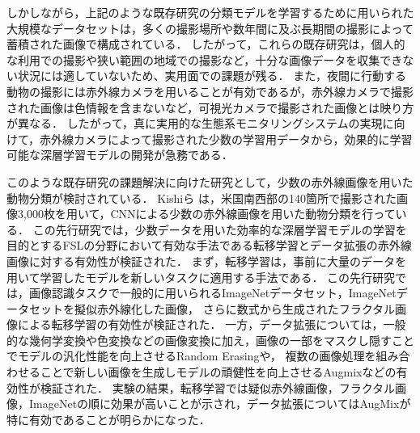 しかしながら，上記のような既存研究の分類モデルを学習するために用いられた大規模なデータセットは，多くの撮影場所や数年間に及ぶ長期間の撮影によって蓄積された画像で構成されている．
したがって，これらの既存研究は，個人的な利用での撮影や狭い範囲の地域での撮影など，十分な画像データを収集できない状況には適していないため、実用面での課題が残る．
また，夜間に行動する動物の撮影には赤外線カメラを用いることが有効であるが，赤外線カメラで撮影された画像は色情報を含まないなど，可視光カメラで撮影された画像とは映り方が異なる．
したがって，真に実用的な生態系モニタリングシステムの実現に向けて，赤外線カメラによって撮影された少数の学習用データから，効果的に学習可能な深層学習モデルの開発が急務である．

このような既存研究の課題解決に向けた研究として，少数の赤外線画像を用いた動物分類が検討されている．
Kishiら \cite{kishimoto2023}は，米国南西部の140箇所で撮影された画像3,000枚を用いて，CNNによる少数の赤外線画像を用いた動物分類を行っている．
この先行研究では，少数データを用いた効率的な深層学習モデルの学習を目的とするFSLの分野において有効な手法である転移学習とデータ拡張の赤外線画像に対する有効性が検証された．
まず，転移学習は，事前に大量のデータを用いて学習したモデルを新しいタスクに適用する手法である．
この先行研究では，画像認識タスクで一般的に用いられるImageNetデータセット，ImageNetデータセットを擬似赤外線化した画像，
さらに数式から生成されたフラクタル画像による転移学習の有効性が検証された．
一方，データ拡張については，一般的な幾何学変換や色変換などの画像変換に加え，画像の一部をマスクし隠すことでモデルの汎化性能を向上させるRandom Erasingや，
複数の画像処理を組み合わせることで新しい画像を生成しモデルの頑健性を向上させるAugmixなどの有効性が検証された．
実験の結果，転移学習では疑似赤外線画像，フラクタル画像，ImageNetの順に効果が高いことが示され，データ拡張についてはAugMixが特に有効であることが明らかになった．

